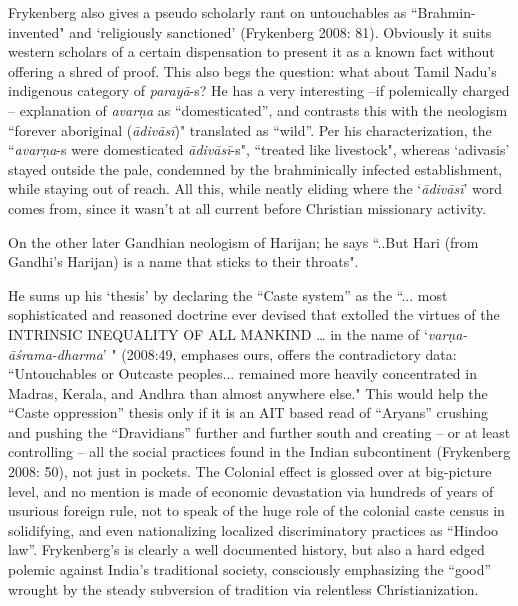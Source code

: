 Frykenberg also gives a pseudo scholarly rant on untouchables as “Brahmin-invented" and ‘religiously sanctioned’ (Frykenberg 2008: 81). Obviously it suits western scholars of a certain dispensation to present it as a known fact without offering a shred of proof. This also begs the question: what about Tamil Nadu’s indigenous category of \textit{parayā}-s? He has a very interesting –if polemically charged – explanation of \textit{avarṇa} as “domesticated”, and contrasts this with the neologism “forever aboriginal (\textit{ādivāsī})" translated as “wild”. Per his characterization, the “\textit{avarṇa}-s were domesticated \textit{ādivāsī}-s", “treated like livestock", whereas ‘adivasis' stayed outside the pale, condemned by the brahminically infected establishment, while staying out of reach. All this, while neatly eliding where the ‘\textit{ādivāsī}’ word comes from, since it wasn’t at all current before Christian missionary activity.

On the other later Gandhian neologism of Harijan; he says “..But Hari (from Gandhi’s Harijan) is a name that sticks to their throats".

He sums up his ‘thesis’ by declaring the “Caste system” as the “... most sophisticated and reasoned doctrine ever devised that extolled the virtues of the INTRINSIC INEQUALITY OF ALL MANKIND … in the name of ‘\textit{varṇa-āśrama-dharma}’ " (2008:49, emphases ours, offers the contradictory data: “Untouchables or Outcaste peoples... remained more heavily concentrated in Madras, Kerala, and Andhra than almost anywhere else." This would help the “Caste oppression” thesis only if it is an AIT based read of “Aryans” crushing and pushing the “Dravidians” further and further south and creating – or at least controlling – all the social practices found in the Indian subcontinent (Frykenberg 2008: 50), not just in pockets. The Colonial effect is glossed over at big-picture level, and no mention is made of economic devastation via hundreds of years of usurious foreign rule, not to speak of the huge role of the colonial caste census in solidifying, and even nationalizing localized discriminatory practices as “Hindoo law”. Frykenberg’s is clearly a well documented history, but also a hard edged polemic against India’s traditional society, consciously emphasizing the “good” wrought by the steady subversion of tradition via relentless Christianization.

